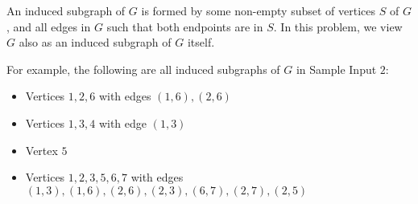 An induced subgraph of $G$ is formed by some non-empty subset of vertices $S$ of $G$, and all edges in $G$ such that both endpoints are in $S$.
In this problem, we view $G$ also as an induced subgraph of $G$ itself.

For example, the following are all induced subgraphs of $G$ in Sample Input $2$:
\begin{itemize}
    \item Vertices $1,2,6$ with edges $(1,6),(2,6)$
    \item Vertices $1,3,4$ with edge $(1,3)$
    \item Vertex $5$
    \item Vertices $1,2,3,5,6,7$ with edges $(1,3),(1,6),(2,6),(2,3),(6,7),(2,7),(2,5)$
\end{itemize}